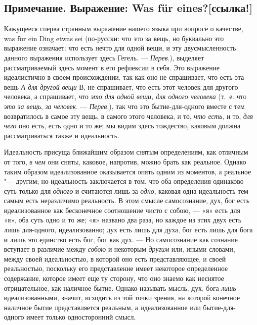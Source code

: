 \subsection*{Примечание. Выражение: Was für eines?[ссылка!]}

Кажущееся сперва странным выражение нашего языка при вопросе о качестве, was
für ein Ding etwas sei (по-русски: что это за вещь, но буквально это
выражение означает: что есть нечто для одной вещи, и эту двусмысленность
данного выражения использует здесь Гегель. — {\em Перев}.), выделяет
рассматриваемый здесь момент в его рефлексии в себя. Это выражение
идеалистично в своем происхождении, так как оно не спрашивает, что есть эта
вещь {\em А для другой вещи} В, не спрашивает, что есть
этот человек для другого человека, а спрашивает, что
{\em это для одной вещи, для одного человека} (т.~е.
что {\em это за вещь}, {\em за
человек}. — {\em Перев}.), так что это бытие-для-одного вместе с тем
возвратилось в самое эту вещь, в самого этого человека, и то,
{\em что есть}, и то, {\em для
чего} оно есть, есть одно и то же; мы видим здесь тождество, каковым должна
рассматриваться также и идеальность.

Идеальность присуща ближайшим образом снятым определениям, как отличным от
того, {\em в чем} они сняты, каковое, напротив, можно
брать как реальное. Однако таким образом идеализованное оказывается опять
одним из моментов, а реальное "--- другим; но идеальность заключается в том,
что оба определения одинаково суть только для
{\em одного} и считаются лишь за
{\em одно}, каковая одна идеальность тем самым есть
неразличимо реальность. В этом смысле самосознание, дух, бог есть
идеализованное как бесконечное соотношение чисто с собою, — «я» есть для
«я», оба суть одно и то же; «я» названо два раза, но каждое из этих двух
есть лишь для-одного, идеализованно; дух есть лишь для духа, бог есть лишь
для бога и лишь это единство есть бог, бог как дух. — Но самосознание как
сознание вступает в различие между {\em собою} и
некоторым {\em другим} или, иными словами, между своей
идеальностью, в которой оно есть представляющее, и своей реальностью,
поскольку его представление имеет некоторое определенное содержание,
которое имеет еще ту сторону, что оно знаемо как неснятое отрицательное,
как наличное бытие. Однако называть мысль, дух, бога
{\em лишь} идеализованными, значит, исходить из той
точки зрения, на которой конечное наличное бытие представляется реальным, а
идеализованное или бытие-для-одного имеет только односторонний смысл.

